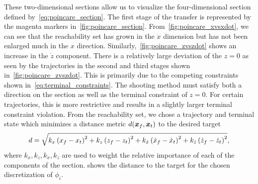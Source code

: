 \documentclass[]{aiaa-tc}%
\begin{document}
These two-dimensional sections allow us to visualize the four-dimensional \Poincare section defined by~\cref{eq:poincare_section}.
The first stage of the transfer is represented by the magenta markers in~\cref{fig:poincare_section}.
From~\cref{fig:poincare_xvsxdot}, we can see that the reachability set has grown in the \( \dot{x} \) dimension but has not been enlarged much in the \( x \) direction.
Similarly,~\cref{fig:poincare_zvszdot} shows an increase in the \( \dot{z} \) component.
There is a relatively large deviation of the \( z = 0 \) as seen by the trajectories in the second and third stages shown in~\cref{fig:poincare_zvszdot}. 
This is primarily due to the competing constraints shown in~\cref{eq:terminal_constraints}.
The shooting method must satisfy both a direction on the \Poincare section as well as the terminal constraint of \( z = 0\).
For certain trajectories, this is more restrictive and results in a slightly larger terminal constraint violation.
From the reachability set, we chose a trajectory and terminal state which minimizes a distance metric \( d(\bm{x}_f,\bm{x}_t) \) to the desired target
\begin{align}\label{eq:reach_dist}
    d = \sqrt{k_x \left( x_f - x_t  \right)^2 + k_z \left( z_f - z_t  \right)^2 + k_{\dot{x}}\left( \dot{x}_f - \dot{x}_t  \right)^2 + k_{\dot{z}}\left( \dot{z}_f - \dot{z}_t  \right)^2} ,
\end{align}
where \( k_x, k_z, k_{\dot{x}}, k_{\dot{z}} \) are used to weight the relative importance of each of the components of the \Poincare section.
 shows the distance to the target for the chosen discretization of \( \phi_i \).
\end{document}
